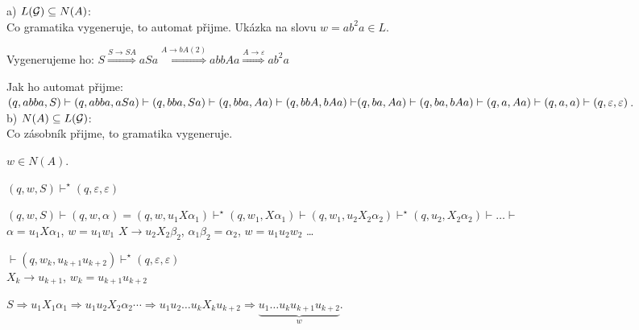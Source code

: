 a) $L(\mathcal{G}) \subseteq N(A)$:\\ 
Co gramatika vygeneruje, to automat přijme. Ukázka na slovu $w = ab^2 a \in L$. 

Vygenerujeme ho: 
$
S \stackrel{S \rightarrow SA}{\Longrightarrow} aSa \stackrel{A \rightarrow bA (2)}{\Longrightarrow} abbAa 
\stackrel{A \rightarrow \varepsilon}{\Longrightarrow} ab^2a
$

Jak ho automat přijme: 
$
{(q, abba, S) \vdash (q, abba, aSa) \vdash (q, bba, Sa) \vdash (q, bba, Aa) \vdash (q, bbA, bAa) \vdash }\\
{(q, ba, Aa) \vdash (q, ba, bAa) \vdash (q, a, Aa) \vdash (q, a, a) \vdash (q, \varepsilon, \varepsilon)}
$.\\

b) $N(A) \subseteq L(\mathcal{G})$:\\
Co zásobník přijme, to gramatika vygeneruje. 

$w \in N(A)$. 

$(q, w, S) \vdash^{\star} (q, \varepsilon, \varepsilon) $

$(q, w, S) \vdash (q, w, \alpha) = (q, w, u_1 X \alpha_1) \vdash^{\star} (q, w_1, X \alpha_1) \vdash 
(q, w_1, u_2 X_2 \alpha_2) \vdash^{\star} (q, u_2, X_2 \alpha_2) \vdash \dots \vdash $\\ 
\hspace*{23mm}$\alpha = u_1 X \alpha_1$, $w = u_1 w_1$ \hspace*{7mm}$X \to u_2 X_2 \beta_2$, $\alpha_1 
\beta_2 = \alpha_2$, $w = u_1 u_2 w_2$ \hspace*{8mm}\dots 

\hspace*{3mm}$\vdash (q, w_k, u_{k+1} u_{k+2}) \vdash^{\star} (q, \varepsilon, \varepsilon)$ \\ 
\hspace*{8mm}$X_k \to u_{k+1}$, $w_k = u_{k+1} u_{k+2}$ 


$S \Longrightarrow u_1 X_1 \alpha_1 \Longrightarrow u_1 u_2 X_2 \alpha_2 \cdots \Longrightarrow u_1 u_2 \dots 
u_k X_k u_{k+2} \Longrightarrow \underbrace{u_1 \dots u_k u_{k+1} u_{k+2}}_w$.

